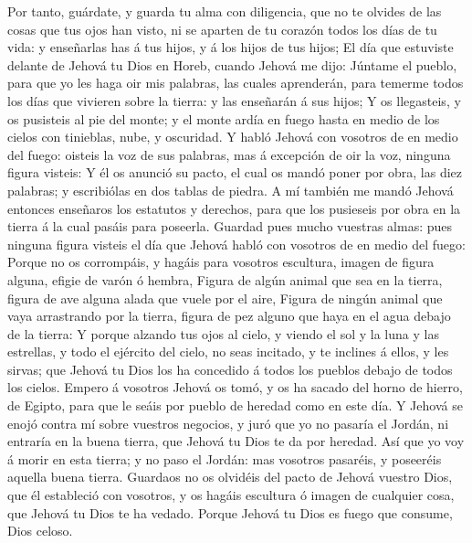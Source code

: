  Por tanto, guárdate, y guarda tu alma con diligencia, que
no te olvides de las cosas que tus ojos han visto, ni se aparten de tu
corazón todos los días de tu vida: y enseñarlas has á tus hijos, y á los
hijos de tus hijos;  El día que estuviste delante de Jehová
tu Dios en Horeb, cuando Jehová me dijo: Júntame el pueblo, para que yo
les haga oir mis palabras, las cuales aprenderán, para temerme todos los
días que vivieren sobre la tierra: y las enseñarán á sus hijos;
 Y os llegasteis, y os pusisteis al pie del monte; y el
monte ardía en fuego hasta en medio de los cielos con tinieblas, nube, y
oscuridad.  Y habló Jehová con vosotros de en medio del
fuego: oisteis la voz de sus palabras, mas á excepción de oir la voz,
ninguna figura visteis:  Y él os anunció su pacto, el cual
os mandó poner por obra, las diez palabras; y escribiólas en dos tablas
de piedra.  A mí también me mandó Jehová entonces enseñaros
los estatutos y derechos, para que los pusieseis por obra en la tierra á
la cual pasáis para poseerla.  Guardad pues mucho vuestras
almas: pues ninguna figura visteis el día que Jehová habló con vosotros
de en medio del fuego:  Porque no os corrompáis, y hagáis
para vosotros escultura, imagen de figura alguna, efigie de varón ó
hembra,  Figura de algún animal que sea en la tierra,
figura de ave alguna alada que vuele por el aire,  Figura
de ningún animal que vaya arrastrando por la tierra, figura de pez
alguno que haya en el agua debajo de la tierra:  Y porque
alzando tus ojos al cielo, y viendo el sol y la luna y las estrellas, y
todo el ejército del cielo, no seas incitado, y te inclines á ellos, y
les sirvas; que Jehová tu Dios los ha concedido á todos los pueblos
debajo de todos los cielos.  Empero á vosotros Jehová os
tomó, y os ha sacado del horno de hierro, de Egipto, para que le seáis
por pueblo de heredad como en este día.  Y Jehová se enojó
contra mí sobre vuestros negocios, y juró que yo no pasaría el Jordán,
ni entraría en la buena tierra, que Jehová tu Dios te da por heredad.
 Así que yo voy á morir en esta tierra; y no paso el
Jordán: mas vosotros pasaréis, y poseeréis aquella buena tierra.
 Guardaos no os olvidéis del pacto de Jehová vuestro Dios,
que él estableció con vosotros, y os hagáis escultura ó imagen de
cualquier cosa, que Jehová tu Dios te ha vedado.  Porque
Jehová tu Dios es fuego que consume, Dios celoso.

